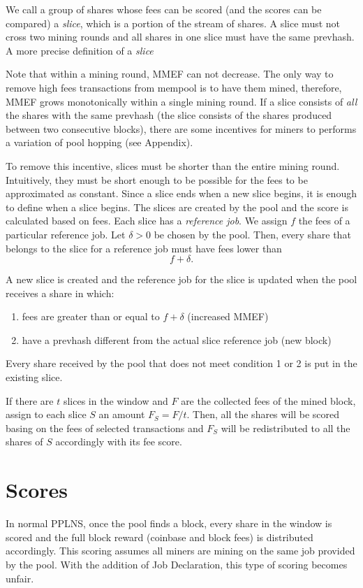 \documentclass[11pt]{article}
\begin{document}
We call a group of shares whose fees can be scored (and the scores can be compared) a \emph{slice}, which is a portion of the stream of shares. A slice must not cross two mining rounds and all shares in one slice must have the same prevhash. A more precise definition of a \emph{slice}

Note that within a mining round, MMEF can not decrease. The only way to remove high fees transactions from mempool is to have them mined, therefore, MMEF grows monotonically within a single mining round. If a slice consists of \emph{all} the shares with the same prevhash (the slice consists of the shares produced between two consecutive blocks), there are some incentives for miners to performs a variation of pool hopping (see Appendix).

To remove this incentive, slices must be shorter than the entire mining round. Intuitively, they must be short enough to be possible for the fees to be approximated as constant. Since a slice ends when a new slice begins, it is enough to define when a slice begins. The slices are created by the pool and the score is calculated based on fees. Each slice has a \emph{reference job}. We assign $f$ the fees of a particular reference job. Let $\delta>0$ be chosen by the pool. Then, every share that belongs to the slice for a reference job must have fees lower than \[ f+\delta.\]

A new slice is created and the reference job for the slice is updated when the pool receives a share in which:
\begin{enumerate}
	\item fees are greater than or equal to $f+\delta$ (increased MMEF)
	\item have a prevhash different from the actual slice reference job (new block)
\end{enumerate}
Every share received by the pool that does not meet condition 1 or 2 is put in the existing slice. 

If there are $t$ slices in the window and $F$ are the collected fees of the mined block, assign to each slice $S$ an amount $F_S = F/t$. Then, all the shares will be scored basing on the fees of selected transactions and $F_S$ will be redistributed to all the shares of $S$ accordingly with its fee score.

\section{Scores}
In normal PPLNS, once the pool finds a block, every share in the window is scored and the full block reward (coinbase and block fees) is distributed accordingly. This scoring assumes all miners are mining on the same job provided by the pool. With the addition of Job Declaration, this type of scoring becomes unfair. 
\end{document}
